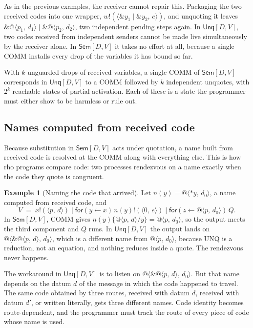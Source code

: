 \documentclass[11pt,a4paper]{article}
\makeatletter
\theoremstyle{plain}
\theoremstyle{definition}
\newtheorem{example}[theorem]{Example}
\theoremstyle{remark}
\newcommand{\rhoc}{\textsf{rho}}
\newcommand{\pr}[2]{\langle #1,\,#2\rangle}
\newcommand{\qn}[2]{@\langle #1,\,#2\rangle}
\newcommand{\out}[2]{#1!(#2)}
\newcommand{\rcv}[3]{\mathsf{for}(#1 \leftarrow #2)\,#3}
\newcommand{\drop}[1]{{*}#1}
\newcommand{\unq}[1]{\mathop{\&}#1}
\newcommand{\ssub}[2]{\{#1/#2\}}
\newcommand{\Sem}{\textsf{Sem}[D,V]}
\newcommand{\Unq}{\textsf{Unq}[D,V]}
\makeatother
\begin{document}
As in the previous examples, the receiver cannot repair this. Packaging the
two received codes into one wrapper, $\out{w}{\pr{\unq{y_1}\mid\unq{y_2}}{e}}$,
and unquoting it leaves $\unq{\qn{p_1}{d_1}}\mid\unq{\qn{p_2}{d_2}}$, two
independent pending steps again. In $\Unq$, two codes received from
independent senders cannot be made live simultaneously by the receiver alone.
In $\Sem$ it takes no effort at all, because a single COMM installs every
drop of the variables it has bound so far.

With $k$ unguarded drops of received variables, a single COMM of $\Sem$
corresponds in $\Unq$ to a COMM followed by $k$ independent unquotes, with
$2^k$ reachable states of partial activation. Each of these is a state the
programmer must either show to be harmless or rule out.

\subsection{Names computed from received code}

Because substitution in $\Sem$ acts under quotation, a name built from
received code is resolved at the COMM along with everything else. This is how
\rhoc{} programs compare code: two processes rendezvous on a name exactly when
the code they quote is congruent.

\begin{example}[Naming the code that arrived]\label{ex:name}
Let $n(y)=\qn{\drop{y}}{d_0}$, a name computed from received code, and
\[
  V \;=\; \out{x}{\pr{p}{d}}\mid\rcv{y}{x}{\out{n(y)}{\pr{0}{e}}}
       \mid\rcv{z}{\qn{p}{d_0}}{Q}.
\]
In $\Sem$, COMM gives $n(y)\ssub{\qn{p}{d}}{y}=\qn{p}{d_0}$, so the output
meets the third component and $Q$ runs. In $\Unq$ the output lands on
$\qn{\unq{\qn{p}{d}}}{d_0}$, which is a different name from $\qn{p}{d_0}$,
because UNQ is a reduction, not an equation, and nothing reduces inside a
quote. The rendezvous never happens.
\end{example}

The workaround in $\Unq$ is to listen on $\qn{\unq{\qn{p}{d}}}{d_0}$. But that
name depends on the datum $d$ of the message in which the code happened to
travel. The same code obtained by three routes, received with datum $d$,
received with datum $d'$, or written literally, gets three different names.
Code identity becomes route-dependent, and the programmer must track the route
of every piece of code whose name is used.
\end{document}
